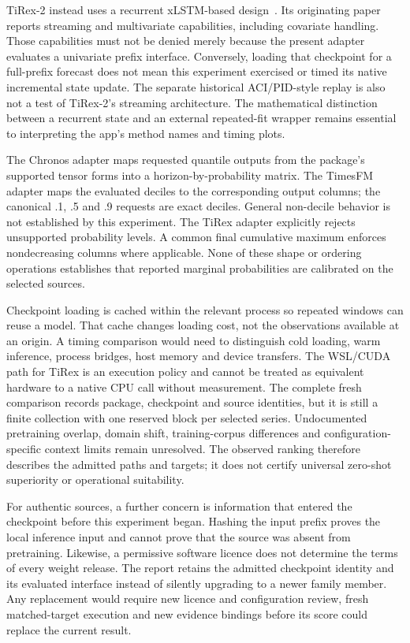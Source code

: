 TiRex-2 instead uses a recurrent xLSTM-based design~\cite{tirex}. Its originating paper reports streaming and multivariate capabilities, including covariate handling. Those capabilities must not be denied merely because the present adapter evaluates a univariate prefix interface. Conversely, loading that checkpoint for a full-prefix forecast does not mean this experiment exercised or timed its native incremental state update. The separate historical ACI/PID-style replay is also not a test of TiRex-2's streaming architecture. The mathematical distinction between a recurrent state and an external repeated-fit wrapper remains essential to interpreting the app's method names and timing plots.

The Chronos adapter maps requested quantile outputs from the package's supported tensor forms into a horizon-by-probability matrix. The TimesFM adapter maps the evaluated deciles to the corresponding output columns; the canonical .1, .5 and .9 requests are exact deciles. General non-decile behavior is not established by this experiment. The TiRex adapter explicitly rejects unsupported probability levels. A common final cumulative maximum enforces nondecreasing columns where applicable. None of these shape or ordering operations establishes that reported marginal probabilities are calibrated on the selected sources.

Checkpoint loading is cached within the relevant process so repeated windows can reuse a model. That cache changes loading cost, not the observations available at an origin. A timing comparison would need to distinguish cold loading, warm inference, process bridges, host memory and device transfers. The WSL/CUDA path for TiRex is an execution policy and cannot be treated as equivalent hardware to a native CPU call without measurement. The complete fresh comparison records package, checkpoint and source identities, but it is still a finite collection with one reserved block per selected series. Undocumented pretraining overlap, domain shift, training-corpus differences and configuration-specific context limits remain unresolved. The observed ranking therefore describes the admitted paths and targets; it does not certify universal zero-shot superiority or operational suitability.

For authentic sources, a further concern is information that entered the checkpoint before this experiment began. Hashing the input prefix proves the local inference input and cannot prove that the source was absent from pretraining. Likewise, a permissive software licence does not determine the terms of every weight release. The report retains the admitted checkpoint identity and its evaluated interface instead of silently upgrading to a newer family member. Any replacement would require new licence and configuration review, fresh matched-target execution and new evidence bindings before its score could replace the current result.

